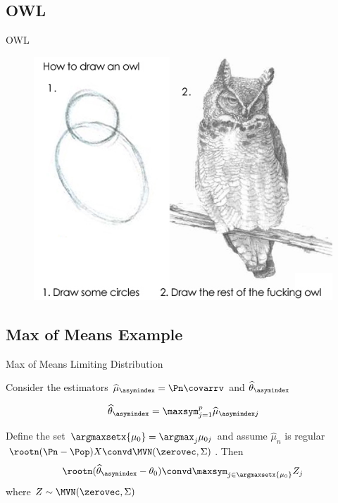 \documentclass[aspectratio=169, professionalfonts]{beamer}
\begin{document}
\subsection{OWL}
\begin{frame}{OWL}
	\begin{figure}
		\includegraphics[width=.6\textwidth]{figures/how-to-draw-an-owl}
	\end{figure}
\end{frame}

\subsection{Max of Means Example}
\begin{frame}{Max of Means Limiting Distribution}

	Consider the estimators $\widehat{\mu}_{\asymindex} = \Pn \covarrv$  and $\widehat{\theta}_{\asymindex}$

	$$\widehat{\theta}_{\asymindex} = \maxsym_{j = 1}^p \widehat{\mu}_{\asymindex j}$$

	\begin{lemma}
		Define the set $\argmaxsetx{\mu_{0}} = \argmax_j \mu_{0j}$ and assume
		$\widehat{\mu}_n$ is regular $\rootn (\Pn - \Pop)X \convd \MVN(\zerovec, \Sigma)$. Then
		\begin{displaymath}
			\rootn (\widehat{\theta}_{\asymindex} - \theta_0) \convd \maxsym_{j \in \argmaxsetx{\mu_0}} Z_j
		\end{displaymath}
		where $Z \sim \MVN(\zerovec, \Sigma)$
	\end{lemma}

\end{frame}
\end{document}
